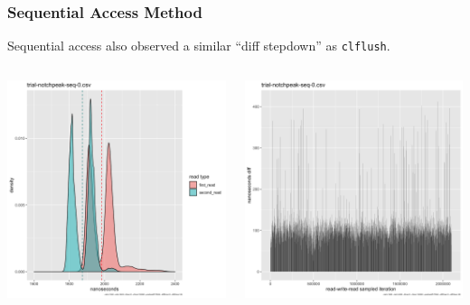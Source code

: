\documentclass{beamer}
\begin{document}
\begin{frame}
 \frametitle{Sequential Access Method}
 Sequential access also observed a similar ``diff stepdown'' as \texttt{clflush}.
 \begin{columns}
  \begin{column}{0.5\textwidth}
   \includegraphics[width=\linewidth]{trial-notchpeak-seq-0-histogram.png}

  \end{column}
  \begin{column}{0.5\textwidth}
   \includegraphics[width=\linewidth]{trial-notchpeak-seq-0-barchart.png}

  \end{column}

 \end{columns}

\end{frame}
\end{document}
